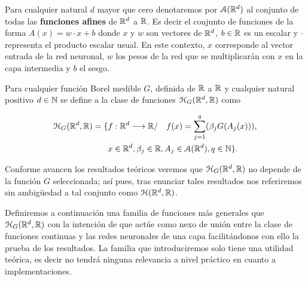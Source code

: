 Para cualquier natural $d$ mayor que cero  denotaremos por $\mathcal{A}(\mathbb{R}^d)$ al conjunto de todas 
las \textbf{funciones afines} de $\mathbb{R}^d$ a $\mathbb{R}$. Es decir el conjunto de funciones de la forma 
$A(x) = w \cdot x + b$ donde $x$ y $w$ son vectores de $\mathbb{R}^d$,  $b \in \mathbb{R}$ es un escalar
 y $\cdot$ representa el producto escalar
usual. En este contexto, $x$ corresponde al vector entrada de la red neuronal, $w$ los pesos de la red
que se multiplicarán con $x$ en la capa intermedia y $b$ el sesgo. 

\begin{definicion} 
    Para cualquier función Borel medible $G$, definida de $\mathbb{R}$ a $\mathbb{R}$ y cualquier natural positivo
    $d \in \mathbb{N}$ se define a la clase de funciones $\mathcal{H}_G(\mathbb{R}^d,\mathbb{R})$ como 

    \begin{equation}
        \begin{split}
        \mathcal{H}_G(\mathbb{R}^d,\mathbb{R}) = 
        \{ 
            & f: \mathbb{R} ^d \longrightarrow \mathbb{R} / \quad
            f(x)=\sum_{j = 1} ^q (
            \beta_j G(A_{j}(x))), \\
            & x  \in \mathbb{R} ^d, \beta_j \in \mathbb{R}, A_{j}\in \mathcal{A}(\mathbb{R}^d),q \in \mathbb{N}
        \}.
        \end{split}
    \end{equation}

    Conforme avancen los resultados teóricos veremos que $\mathcal{H}_G(\mathbb{R}^d,\mathbb{R})$ 
    no depende de la función $G$ seleccionada; así pues, tras enunciar tales resultados nos referiremos sin ambigüedad a tal conjunto como $\mathcal{H}(\mathbb{R}^d,\mathbb{R})$.
\end{definicion}


Definiremos a continuación una familia de funciones más generales que $\mathcal{H}_G(\mathbb{R}^d,\mathbb{R})$ con la intención de que actúe como nexo de unión entre la clase de funciones continuas y las redes neuronales de una capa facilitándonos con ello la prueba de los resultados. La familia que introduciremos solo tiene 
una utilidad teórica, es decir no tendrá ninguna relevancia a nivel práctico en cuanto a implementaciones.
   
